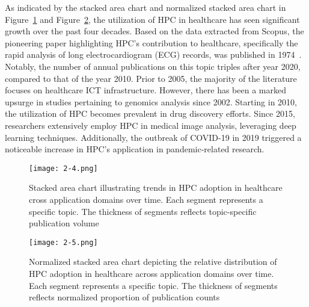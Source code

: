 As indicated by the stacked area chart and normalized stacked area chart in Figure~\ref{fig:2-4} and Figure~\ref{fig:2-5}, the utilization of HPC in healthcare has seen significant growth over the past four decades. Based on the data extracted from Scopus, the pioneering paper highlighting HPC's contribution to healthcare, specifically the rapid analysis of long electrocardiogram (ECG) records, was published in 1974~\cite{clark1974high}. Notably, the number of annual publications on this topic triples after year 2020, compared to that of the year 2010. Prior to 2005, the majority of the literature focuses on healthcare ICT infrastructure. However, there has been a marked upsurge in studies pertaining to genomics analysis since 2002. Starting in 2010, the utilization of HPC becomes prevalent in drug discovery efforts. Since 2015, researchers extensively employ HPC in medical image analysis, leveraging deep learning techniques. Additionally, the outbreak of COVID-19 in 2019 triggered a noticeable increase in HPC's application in pandemic-related research.
\begin{figure}[!h]
\centering
\texttt{[image: 2-4.png]}
\caption{Stacked area chart illustrating trends in HPC adoption in healthcare cross application domains over time. Each segment represents a specific topic. The thickness of segments reflects topic-specific publication volume}
\label{fig:2-4}
\end{figure}

\begin{figure}[!h]
\centering
\texttt{[image: 2-5.png]}
\caption{Normalized stacked area chart depicting the relative distribution of HPC adoption in healthcare across application domains over time. Each segment represents a specific topic. The thickness of segments reflects normalized proportion of publication counts}
\label{fig:2-5}
\end{figure}

